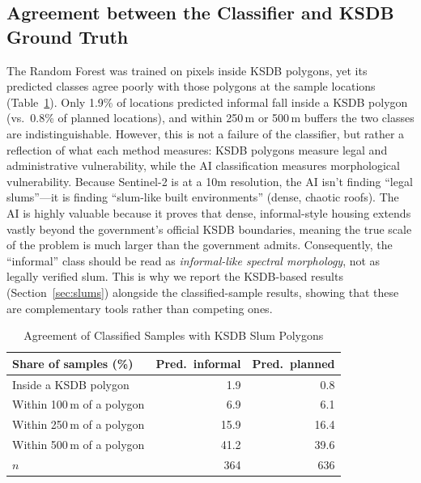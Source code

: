 \documentclass[conference]{IEEEtran}
\newcommand{\m}{\,m}
\begin{document}
\subsection{Agreement between the Classifier and KSDB Ground Truth}
The Random Forest was trained on pixels inside KSDB polygons, yet its predicted classes agree poorly with those polygons at the sample locations (Table~\ref{tab:agree}). Only 1.9\% of locations predicted informal fall inside a KSDB polygon (vs.\ 0.8\% of planned locations), and within 250\m{} or 500\m{} buffers the two classes are indistinguishable. However, this is not a failure of the classifier, but rather a reflection of what each method measures: KSDB polygons measure legal and administrative vulnerability, while the AI classification measures morphological vulnerability. Because Sentinel-2 is at a 10m resolution, the AI isn't finding ``legal slums''---it is finding ``slum-like built environments'' (dense, chaotic roofs). The AI is highly valuable because it proves that dense, informal-style housing extends vastly beyond the government's official KSDB boundaries, meaning the true scale of the problem is much larger than the government admits. Consequently, the ``informal'' class should be read as \emph{informal-like spectral morphology}, not as legally verified slum. This is why we report the KSDB-based results (Section~\ref{sec:slums}) alongside the classified-sample results, showing that these are complementary tools rather than competing ones.

\begin{table}[!t]
\centering
\caption{Agreement of Classified Samples with KSDB Slum Polygons}
\label{tab:agree}
\footnotesize
\begin{tabular}{@{}lrr@{}}
\toprule
\textbf{Share of samples (\%)} & \textbf{Pred.\ informal} & \textbf{Pred.\ planned} \\
\midrule
Inside a KSDB polygon & 1.9 & 0.8 \\
Within 100\m{} of a polygon & 6.9 & 6.1 \\
Within 250\m{} of a polygon & 15.9 & 16.4 \\
Within 500\m{} of a polygon & 41.2 & 39.6 \\
\midrule
$n$ & 364 & 636 \\
\bottomrule
\end{tabular}
\end{table}
\end{document}
